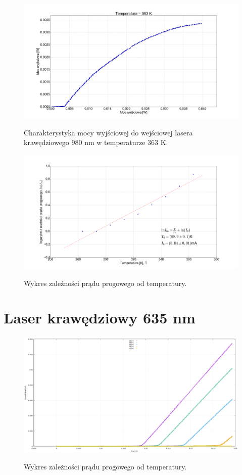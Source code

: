 \documentclass[a4paper, portrait,12pt]{report}
\begin{document}
\begin{figure}
\center
  \includegraphics[scale=0.30]{plot980/temp_90_power.png}
  \label{rys1}
  \caption{Charakterystyka mocy wyjściowej do wejściowej lasera krawędziowego 980 nm w temperaturze 363 K.} 
\end{figure}






\begin{figure}
\center
  \includegraphics[scale=0.30]{plot980/fit_i_th.png}
  \label{rys1}
  \caption{Wykres zależności prądu progowego od temperatury.} 
\end{figure}

\newpage
\section{Laser krawędziowy 635 nm}

\begin{figure}
\center
  \includegraphics[scale=0.30]{plot635/plot_all.png}
  \label{rys1}
  \caption{Wykres zależności prądu progowego od temperatury.} 
\end{figure}


\fi
\end{document}

